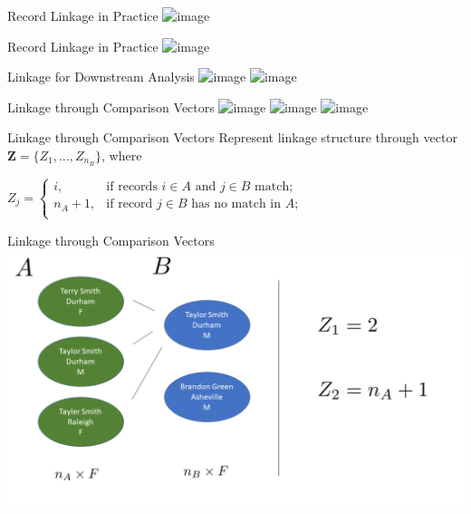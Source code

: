 \documentclass{beamer}
\begin{document}
\begin{frame}{Record Linkage in Practice}
	\centering
	\includegraphics<1->[width = .8\textwidth, height = .6\textwidth ]{graphics/syria_article_big.png}
\end{frame}

\begin{frame}{Record Linkage in Practice}
	\includegraphics<1->[width = \textwidth, height = .6\textwidth ]{graphics/dnc_big.png}
\end{frame}


\begin{frame}{Linkage for Downstream Analysis}
	\includegraphics<1>[width = \textwidth, height = .7\textwidth ]{graphics/Slide1.png}
	\includegraphics<2>[width = \textwidth, height = .7\textwidth ]{graphics/Slide2.png}
\end{frame}

\begin{frame}{Linkage through Comparison Vectors}
	\includegraphics<1>[width = \textwidth, height = .6\textwidth ]{graphics/Slide3.png}
	\includegraphics<2>[width = \textwidth, height = .6\textwidth ]{graphics/Slide4.png}
	\includegraphics<3>[width = \textwidth, height = .6\textwidth ]{graphics/Slide5.png}
\end{frame}

\begin{frame}{Linkage through Comparison Vectors}
	Represent linkage structure through vector $\mathbf{Z} = \{Z_1, \ldots, Z_{n_B}\}$, where
\begin{center}
	$Z_j = \begin{cases} 
		i,  & \text{if records } i\in A \text{ and } j\in B \text{ match}; \\
		n_A + 1,  & \text{if record } j\in B \text{ has no match in } A; \\
	\end{cases}$
\end{center}
\end{frame}

\begin{frame}{Linkage through Comparison Vectors}
	\includegraphics[width = \textwidth, height = .6\textwidth ]{graphics/Slide6.png}
\end{frame}
\end{document}
